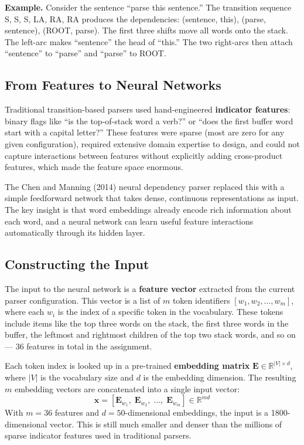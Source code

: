 \documentclass[11pt]{article}
\begin{document}
\textbf{Example.} Consider the sentence ``parse this sentence.'' The transition sequence S, S, S, LA, RA, RA produces the dependencies: (sentence, this), (parse, sentence), (ROOT, parse). The first three shifts move all words onto the stack. The left-arc makes ``sentence'' the head of ``this.'' The two right-arcs then attach ``sentence'' to ``parse'' and ``parse'' to ROOT.

\subsection{From Features to Neural Networks}

Traditional transition-based parsers used hand-engineered \textbf{indicator features}: binary flags like ``is the top-of-stack word a verb?'' or ``does the first buffer word start with a capital letter?'' These features were sparse (most are zero for any given configuration), required extensive domain expertise to design, and could not capture interactions between features without explicitly adding cross-product features, which made the feature space enormous.

The Chen and Manning (2014) neural dependency parser replaced this with a simple feedforward network that takes dense, continuous representations as input. The key insight is that word embeddings already encode rich information about each word, and a neural network can learn useful feature interactions automatically through its hidden layer.

\subsection{Constructing the Input}

The input to the neural network is a \textbf{feature vector} extracted from the current parser configuration. This vector is a list of $m$ token identifiers $[w_1, w_2, \ldots, w_m]$, where each $w_i$ is the index of a specific token in the vocabulary. These tokens include items like the top three words on the stack, the first three words in the buffer, the leftmost and rightmost children of the top two stack words, and so on --- 36 features in total in the assignment.

Each token index is looked up in a pre-trained \textbf{embedding matrix} $\mathbf{E} \in \mathbb{R}^{|V| \times d}$, where $|V|$ is the vocabulary size and $d$ is the embedding dimension. The resulting $m$ embedding vectors are concatenated into a single input vector:
\[
\mathbf{x} = [\mathbf{E}_{w_1},\; \mathbf{E}_{w_2},\; \ldots,\; \mathbf{E}_{w_m}] \in \mathbb{R}^{md}
\]
With $m = 36$ features and $d = 50$-dimensional embeddings, the input is a 1800-dimensional vector. This is still much smaller and denser than the millions of sparse indicator features used in traditional parsers.
\end{document}
